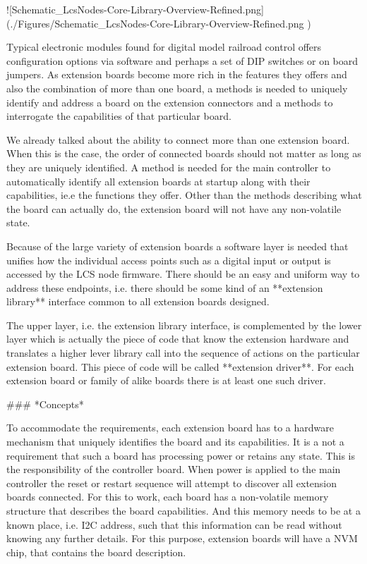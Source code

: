 ![Schematic_LcsNodes-Core-Library-Overview-Refined.png](./Figures/Schematic_LcsNodes-Core-Library-Overview-Refined.png )

Typical electronic modules found for digital model railroad control offers configuration options via software and perhaps a set of DIP switches or on board jumpers. As extension boards become more rich in the features they offers and also the combination of more than one board, a methods is needed to uniquely identify and address a board on the extension connectors and a methods to interrogate the capabilities of that particular board.

We already talked about the ability to connect more than one extension board. When this is the case, the order of connected boards should not matter as long as they are uniquely identified. A method is needed for the main controller to automatically identify all extension boards at startup along with their capabilities, ie.e the functions they offer. Other than the methods describing what the board can actually do, the extension board will not have any non-volatile state.

Because of the large variety of extension boards a software layer is needed that unifies how the individual access points such as a digital input or output is accessed by the LCS node firmware. There should be an easy and uniform way to address these endpoints, i.e. there should be some kind of an **extension library** interface common to all extension boards designed.

The upper layer, i.e. the extension library interface, is complemented by the lower layer which is actually the piece of code that know the extension hardware and translates a higher lever library call into the sequence of actions on the particular extension board. This piece of code will be called **extension driver**. For each extension board or family of alike boards there is at least one such driver.

### *Concepts*

To accommodate the requirements, each extension board has to a hardware mechanism that uniquely identifies the board and its capabilities. It is a not a requirement that such a board has processing power or retains any state. This is the responsibility of the controller board. When power is applied to the main controller the reset or restart sequence will attempt to discover all extension boards connected. For this to work, each board has a non-volatile memory structure that describes the board capabilities. And this memory needs to be at a known place, i.e. I2C address, such that this information can be read without knowing any further details. For this purpose, extension boards will have a NVM chip, that contains the board description.

